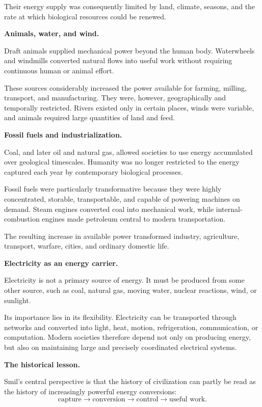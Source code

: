 Their energy supply was consequently
limited by land, climate, seasons, and the
rate at which biological resources could
be renewed.

\medskip\noindent
{\bf Animals, water, and wind.}

Draft animals supplied mechanical power
beyond the human body. Waterwheels and
windmills converted natural flows into
useful work without requiring continuous
human or animal effort.

These sources considerably increased the
power available for farming, milling,
transport, and manufacturing. They were,
however, geographically and temporally
restricted. Rivers existed only in certain
places, winds were variable, and animals
required large quantities of land and feed.

\medskip\noindent
{\bf Fossil fuels and industrialization.}

Coal, and later oil and natural gas, allowed
societies to use energy accumulated over
geological timescales. Humanity was no
longer restricted to the energy captured
each year by contemporary biological
processes.

Fossil fuels were particularly
transformative because they were highly
concentrated, storable, transportable, and
capable of powering machines on demand.
Steam engines converted coal into
mechanical work, while internal-combustion
engines made petroleum central to modern
transportation.

The resulting increase in available power
transformed industry, agriculture,
transport, warfare, cities, and ordinary
domestic life.

\medskip\noindent
{\bf Electricity as an energy carrier.}

Electricity is not a primary source of
energy. It must be produced from some other
source, such as coal, natural gas, moving
water, nuclear reactions, wind, or
sunlight.

Its importance lies in its flexibility.
Electricity can be transported through
networks and converted into light, heat,
motion, refrigeration, communication, or
computation. Modern societies therefore
depend not only on producing energy, but
also on maintaining large and precisely
coordinated electrical systems.

\medskip\noindent
{\bf The historical lesson.}

Smil's central perspective is that the
history of civilization can partly be read
as the history of increasingly powerful
energy conversions:
\[
  \text{capture}
  \longrightarrow
  \text{conversion}
  \longrightarrow
  \text{control}
  \longrightarrow
  \text{useful work}.
\]

